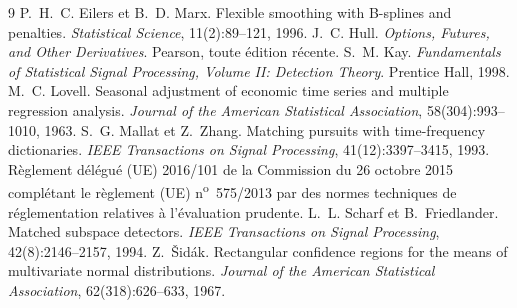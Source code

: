 \begin{thebibliography}{9}
 P.~H.~C. Eilers et B.~D. Marx. Flexible smoothing with B-splines and penalties.
\emph{Statistical Science}, 11(2):89--121, 1996.
 J.~C. Hull. \emph{Options, Futures, and Other Derivatives}. Pearson, toute édition récente.
 S.~M. Kay. \emph{Fundamentals of Statistical Signal Processing, Volume II: Detection Theory}.
Prentice Hall, 1998.
 M.~C. Lovell. Seasonal adjustment of economic time series and multiple regression analysis.
\emph{Journal of the American Statistical Association}, 58(304):993--1010, 1963.
 S.~G. Mallat et Z.~Zhang. Matching pursuits with time-frequency dictionaries.
\emph{IEEE Transactions on Signal Processing}, 41(12):3397--3415, 1993.
 Règlement délégué (UE) 2016/101 de la Commission du 26 octobre 2015 complétant le règlement (UE)
n\textsuperscript{o}~575/2013 par des normes techniques de réglementation relatives à l'évaluation prudente.
 L.~L. Scharf et B.~Friedlander. Matched subspace detectors. \emph{IEEE Transactions on Signal
Processing}, 42(8):2146--2157, 1994.
 Z.~Šidák. Rectangular confidence regions for the means of multivariate normal distributions.
\emph{Journal of the American Statistical Association}, 62(318):626--633, 1967.
\end{thebibliography}
